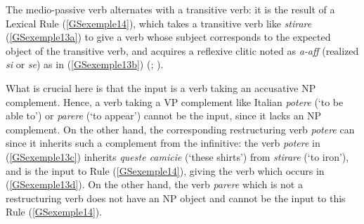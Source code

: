 \documentclass[output=paper
	        ,collection
	        ,collectionchapter
 	        ,biblatex
                ,babelshorthands
                ,newtxmath
                ,draftmode
                ,colorlinks, citecolor=brown
]{langscibook}
\begin{document}
{	\label{GSexemple13b}
		
	 \label{GSexemple13c} 
		
	\label{GSexemple13d}		
		
	\label{GSexemple13e}			
\zl


The medio-passive verb alternates with a transitive verb: it is the result of a Lexical Rule (\ref{GSexemple14}), which takes a transitive verb like \emph{stirare} (\ref{GSexemple13a}) to give a verb whose subject corresponds to the expected object of the transitive verb, and acquires a reflexive clitic noted as \emph{a-aff} (realized \emph{si} or \emph{se}) as in (\ref{GSexemple13b}) (\citealt[31]{AGS1998}; \citealt{Monachesi98a}). 

\begin{exe} 
\end{exe}

What is crucial here is that the input is a verb taking an accusative NP complement. Hence, a verb taking a VP complement like Italian \emph{potere} (`to be able to') or \emph{parere} (`to appear') cannot be the input, since it lacks an NP complement. On the other hand, the corresponding restructuring verb \emph{potere} can since it inherits such a complement from the infinitive: the verb \emph{potere} in (\ref{GSexemple13c}) inherits \emph{queste camicie} (`these shirts') from \emph{stirare} (`to iron'), and is the input to Rule (\ref{GSexemple14}), giving the verb which occurs in (\ref{GSexemple13d}). On the other hand, the verb \emph{parere} which is not a restructuring verb does not have an NP object and cannot be the input to this Rule (\ref{GSexemple14}).

}
\end{document}
